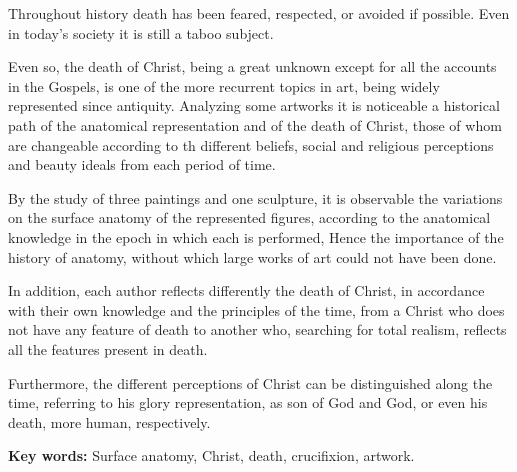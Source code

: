 Throughout history death has been feared, respected, or avoided if possible. Even in today's society it is still a taboo subject.

Even so, the death of Christ, being a great unknown except for all the accounts in the Gospels, is one of the more recurrent topics in art, being widely represented since antiquity. Analyzing some artworks it is noticeable a historical path of the anatomical representation and of the death of Christ, those of whom are changeable according to th different beliefs, social and religious perceptions and beauty ideals from each period of time.

By the study of three paintings and one sculpture, it is observable the variations on the surface anatomy of the represented figures, according to the anatomical knowledge in the epoch in which each is performed, %
Hence the importance of %
the history of anatomy, without which large works of art%
could not have been done.

In addition, each author reflects differently the death of Christ, in accordance with their own knowledge and the principles of the time, from a Christ who does not have any feature of death to another who, searching for total realism, reflects %
all the features present in %
death.


Furthermore, the different perceptions of Christ can be distinguished along the time, referring to his glory representation, as son of God and God, or even his death, more human, respectively.


\textbf{Key words:}
Surface anatomy, Christ, death, crucifixion, artwork.